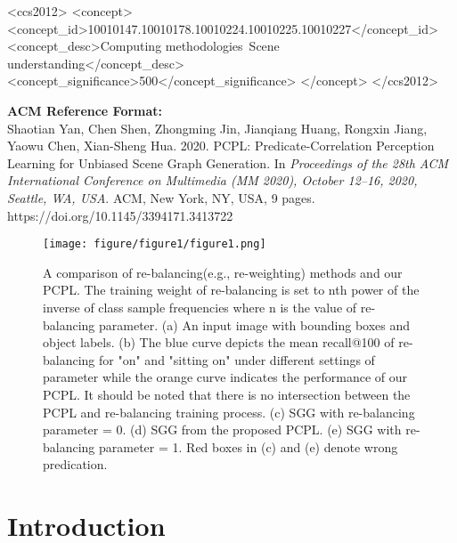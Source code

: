 \documentclass[sigconf]{acmart}
\begin{document}
\begin{CCSXML}
<ccs2012>
<concept>
<concept_id>10010147.10010178.10010224.10010225.10010227</concept_id>
<concept_desc>Computing methodologies~Scene understanding</concept_desc>
<concept_significance>500</concept_significance>
</concept>
</ccs2012>
\end{CCSXML}



\maketitle

{\small\textbf{ACM Reference Format:}\\
Shaotian Yan, Chen Shen, Zhongming Jin,  Jianqiang Huang,  Rongxin  Jiang,  Yaowu Chen,  Xian-Sheng Hua. 2020. PCPL: Predicate-Correlation  Perception Learning for Unbiased Scene Graph Generation. In  \emph{Proceedings of the 28th ACM International Conference on  Multimedia (MM 2020), October 12--16, 2020, Seattle, WA, USA}. ACM,  New York, NY, USA, 9 pages. \\ https://doi.org/10.1145/3394171.3413722}


\begin{figure}
    \centering
    \texttt{[image: figure/figure1/figure1.png]}
    \caption{A comparison of re-balancing(e.g., re-weighting) methods and our PCPL. The training weight of re-balancing is set to nth power of the inverse of class sample frequencies where n is the value of re-balancing parameter. (a) An input image with bounding boxes and object labels. (b) The blue curve depicts the mean recall@100 of re-balancing for "on" and "sitting on" under different settings of parameter while the orange curve indicates the performance of our PCPL. It should be noted that 
    there is no intersection between the PCPL and re-balancing training process. (c) SGG with re-balancing parameter = 0. (d) SGG from the proposed PCPL. (e) SGG with re-balancing parameter = 1. Red boxes in (c) and (e) denote wrong predication.}
    \label{fig:1}
\end{figure}


\section{Introduction}
\end{document}
